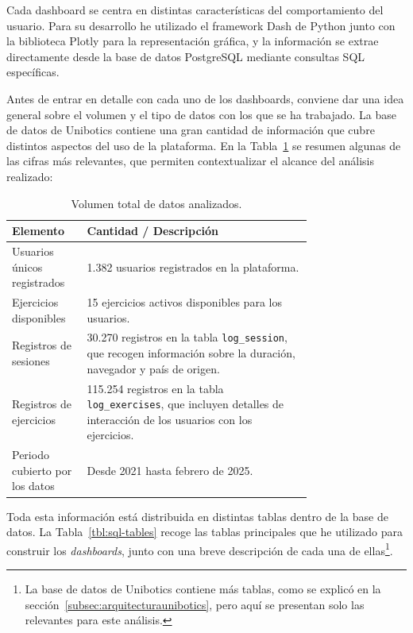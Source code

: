 \documentclass[a4paper, 12pt]{book}
\begin{document}
Cada dashboard se centra en distintas características del comportamiento del usuario. Para su desarrollo he utilizado el framework Dash de Python junto con la biblioteca Plotly para la representación gráfica, y la información se extrae directamente desde la base de datos PostgreSQL mediante consultas SQL específicas.

Antes de entrar en detalle con cada uno de los dashboards, conviene dar una idea general sobre el volumen y el tipo de datos con los que se ha trabajado. La base de datos de Unibotics contiene una gran cantidad de información que cubre distintos aspectos del uso de la plataforma. En la Tabla~\ref{tbl:datos-globales} se resumen algunas de las cifras más relevantes, que permiten contextualizar el alcance del análisis realizado:

\begin{table}[!htb]
\centering
\caption{Volumen total de datos analizados.}
\label{tbl:datos-globales}
\begin{tabular}{lp{0.75\linewidth}}
\toprule
\textbf{Elemento} & \textbf{Cantidad / Descripción} \\
\midrule
Usuarios únicos registrados & 1.382 usuarios registrados en la plataforma. \\
Ejercicios disponibles & 15 ejercicios activos disponibles para los usuarios. \\
Registros de sesiones & 30.270 registros en la tabla \texttt{log\_session}, que recogen información sobre la duración, navegador y país de origen. \\
Registros de ejercicios & 115.254 registros en la tabla \texttt{log\_exercises}, que incluyen detalles de interacción de los usuarios con los ejercicios. \\
Periodo cubierto por los datos & Desde 2021 hasta febrero de 2025. \\
\bottomrule
\end{tabular}
\vspace{1ex}
\end{table}

Toda esta información está distribuida en distintas tablas dentro de la base de datos. La Tabla~\ref{tbl:sql-tables} recoge las tablas principales que he utilizado para construir los \textit{dashboards}, junto con una breve descripción de cada una de ellas\footnote{La base de datos de Unibotics contiene más tablas, como se explicó en la sección~\ref{subsec:arquitecturaunibotics}, pero aquí se presentan solo las relevantes para este análisis.}.
\end{document}
